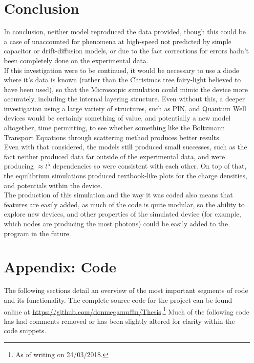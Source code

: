 \documentclass[titlepage]{article}
\begin{document}
\section{Conclusion}
In conclusion, neither model reproduced the data provided, though this could be a case of unaccounted for phenomena at high-speed not predicted by simple capacitor or drift-diffusion models, or due to the fact corrections for errors hadn't been completely done on the experimental data.\\
If this investigation were to be continued, it would be necessary to use a diode where it's data is known (rather than the Christmas tree fairy-light believed to have been used), so that the Microscopic simulation could mimic the device more accurately, including the internal layering structure. Even without this, a deeper investigation using a large variety of structures, such as PIN, and Quantum Well devices would be certainly something of value, and potentially a new model altogether, time permitting, to see whether something like the Boltzmann Transport Equations through scattering method produces better results. \\
Even with that considered, the models still produced small successes,  such as the fact neither produced data far outside of the experimental data, and were producing $\approx t^5$ dependencies so were consistent with each other. On top of that, the equilibrium simulations produced textbook-like plots for the charge densities, and potentials within the device.\\
The production of this simulation and the way it was coded also means that features are easily added, as much of the code is quite modular, so the ability to explore new devices, and other properties of the simulated device (for example, which nodes are producing the most photons) could be easily added to the program in the future.

{}

\newpage

\appendix
\section{Appendix: Code}
The following sections detail an overview of the most important segments of code and its functionality. The complete source code for the project can be found online at \url{https://github.com/donmegamuffin/Thesis}.\footnote{As of writing on 24/03/2018.} Much of the following code has had comments removed or has been slightly altered for clarity within the code snippets.
\end{document}
